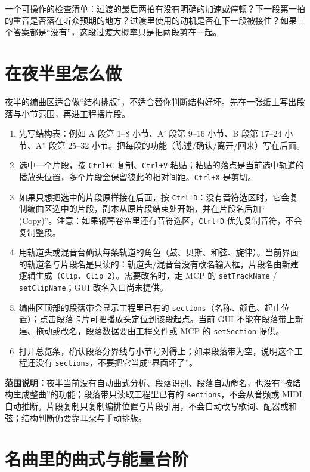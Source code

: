 一个可操作的检查清单：过渡的最后两拍有没有明确的加速或停顿？下一段第一拍的重音是否落在听众预期的地方？过渡里使用的动机是否在下一段被接住？如果三个答案都是“没有”，这段过渡大概率只是把两段剪在一起。

\section{在夜半里怎么做}

夜半的编曲区适合做“结构排版”，不适合替你判断结构好坏。先在一张纸上写出段落与小节范围，再进工程摆片段。

\begin{enumerate}
  \item 先写结构表：例如 A 段第 1--8 小节、A' 段第 9--16 小节、B 段第 17--24 小节、A'' 段第 25--32 小节。把每段的功能（陈述/确认/离开/回来）写在后面。
  \item 选中一个片段，按 \texttt{Ctrl+C} 复制、\texttt{Ctrl+V} 粘贴；粘贴的落点是当前选中轨道的播放头位置，多个片段会保留彼此的相对间距。\texttt{Ctrl+X} 是剪切。
  \item 如果只想把选中的片段原样接在后面，按 \texttt{Ctrl+D}：没有音符选区时，它会复制编曲区选中的片段，副本从原片段结束处开始，并在片段名后加“ (Copy)”。注意：如果钢琴卷帘里还有音符选区，\texttt{Ctrl+D} 优先复制音符，不会复制整段。
  \item 用轨道头或混音台确认每条轨道的角色（鼓、贝斯、和弦、旋律）。当前界面的轨道名与片段名是只读的：轨道头/混音台没有改名输入框，片段名由新建逻辑生成（\texttt{Clip}、\texttt{Clip 2}）。需要改名时，走 MCP 的 \texttt{setTrackName} / \texttt{setClipName}；GUI 改名入口尚未提供。
  \item 编曲区顶部的段落带会显示工程里已有的 \texttt{sections}（名称、颜色、起止位置）；点击段落卡片可把播放头定位到该段起点。当前 GUI 不能在段落带上新建、拖动或改名，段落数据要由工程文件或 MCP 的 \texttt{setSection} 提供。
  \item 打开总览条，确认段落分界线与小节号对得上；如果段落带为空，说明这个工程还没有 \texttt{sections}，不要把它当成“界面坏了”。
\end{enumerate}


\textbf{范围说明：}夜半当前没有自动曲式分析、段落识别、段落自动命名，也没有“按结构生成整曲”的功能；段落带只读取工程里已有的 \texttt{sections}，不会从音频或 MIDI 自动推断。片段复制只复制编排位置与片段引用，不会自动改写歌词、配器或和弦；结构判断仍要靠耳朵与手动排版。

\section{名曲里的曲式与能量台阶}

